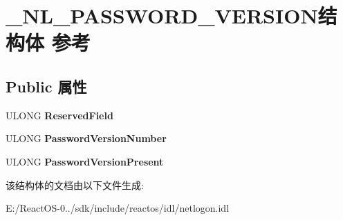 \hypertarget{struct___n_l___p_a_s_s_w_o_r_d___v_e_r_s_i_o_n}{}\section{\+\_\+\+N\+L\+\_\+\+P\+A\+S\+S\+W\+O\+R\+D\+\_\+\+V\+E\+R\+S\+I\+O\+N结构体 参考}
\label{struct___n_l___p_a_s_s_w_o_r_d___v_e_r_s_i_o_n}
\subsection*{Public 属性}
\begin{DoxyCompactItemize}
\item 
\mbox{\label{struct___n_l___p_a_s_s_w_o_r_d___v_e_r_s_i_o_n_a7374ab1e0335036a6b86d93dadd49c41}} 
U\+L\+O\+NG {\bfseries Reserved\+Field}
\item 
\mbox{\label{struct___n_l___p_a_s_s_w_o_r_d___v_e_r_s_i_o_n_a415d367ecd811ba1d31c8cb7e367175a}} 
U\+L\+O\+NG {\bfseries Password\+Version\+Number}
\item 
\mbox{\label{struct___n_l___p_a_s_s_w_o_r_d___v_e_r_s_i_o_n_aa77aad05b0732d64a13f412d786f97ae}} 
U\+L\+O\+NG {\bfseries Password\+Version\+Present}
\end{DoxyCompactItemize}


该结构体的文档由以下文件生成\+:\begin{DoxyCompactItemize}
\item 
E\+:/\+React\+O\+S-\/0../sdk/include/reactos/idl/netlogon.\+idl\end{DoxyCompactItemize}
